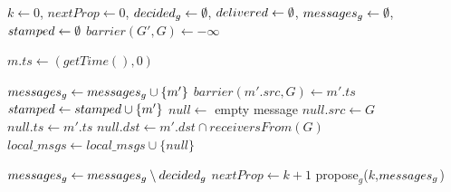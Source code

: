 \documentclass[times, 10pt]{article}
\begin{document}
\begin{algorithm}
\begin{distribalgo}[1]

\blankline
{}
  \STATE $k \leftarrow 0$, $nextProp \leftarrow 0$, $decided\text{$_g$} \leftarrow \emptyset$, $delivered \leftarrow \emptyset$, $messages\text{$_g$} \leftarrow \emptyset$, $stamped \leftarrow \emptyset$
    \STATE $barrier(G',G) \leftarrow -\infty$ 
  \ENDINDENT
\ENDINDENT 

\blankline
{}
  \STATE $m.ts \leftarrow (getTime(),0)$
  \STATE {}
\ENDINDENT

\blankline
{}
    \STATE $messages\text{$_g$} \leftarrow messages\text{$_g$} \cup \{m'\}$
    \STATE $barrier(m'.src,G) \leftarrow m'.ts$ \label{algline:incbar}
      \STATE $stamped \leftarrow stamped \cup \{m'\}$
    \ENDIF
      \STATE $null \leftarrow$ empty message
      \STATE $null.src \leftarrow G$
      \STATE $null.ts \leftarrow m'.ts$ \label{algline:nulltsmts}
      \STATE $null.dst \leftarrow m'.dst \cap receiversFrom(G)$
      \STATE $local\_msgs \leftarrow local\_msgs \cup \{null\}$
    \ENDIF
  \ENDIF
\ENDINDENT

\blankline
{}
    \STATE $messages\text{$_g$} \leftarrow messages\text{$_g$} \setminus decided\text{$_g$}$%
    \label{algline:nullstays}
    \IF {$\localmsgs \neq \emptyset$}
      \STATE $nextProp \leftarrow k + 1$
      \STATE propose$_g$($k$,$messages\text{$_g$}$)
    \ENDIF
\ENDINDENT


\end{distribalgo}
\end{algorithm}
\end{document}
